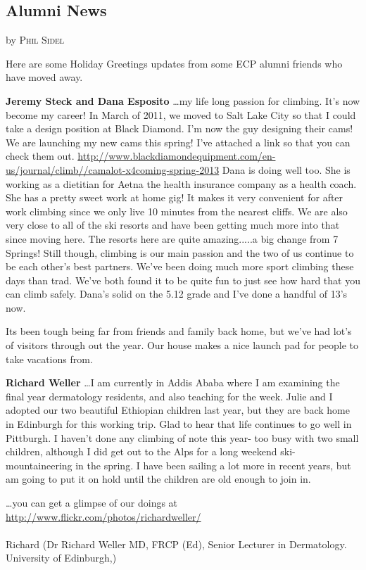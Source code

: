 \documentclass[10pt,a4paper]{article}
\newcommand{\NewsItem}[1]{%
		\usefont{T1}{augie}{m}{n} 	
		\large \bf #1 \vspace{4pt}
		\par \normalsize \normalfont}
\newcommand{\NewsAuthor}[1]{%
			\hfill by \textsc{#1} \vspace{4pt}
			\par \normalfont}
\newcommand\subsect[1]{%
  \subsection*{#1}%
  \addcontentsline{toc}{subsection}{#1}}
\begin{document}
\begin{multicols}{2}
\subsect{Alumni News}

\NewsItem{}
\NewsAuthor{Phil Sidel}
Here are some Holiday Greetings updates from some ECP alumni friends who have moved away.

\vspace{10pt}

\textbf{Jeremy Steck and Dana Esposito}
\dots my life long passion for climbing.   It's now become my career!   In March of 2011, we moved to Salt Lake City so that I could take a design position at Black Diamond.   I'm now the guy designing their cams!   We are launching my new cams this spring!  I've attached a link so that you can check them out.
\url{http://www.blackdiamondequipment.com/en-us/journal/climb//camalot-x4coming-spring-2013}
Dana is doing well too.  She is working as a dietitian for Aetna the health insurance company as a health coach.    She has a pretty sweet work at home gig!   It makes it very convenient for after work climbing since we only live 10 minutes from the nearest cliffs.  We are also very close to all of the ski resorts and have been getting much more into that since moving here.   The resorts here are quite amazing.....a big change from 7 Springs!    Still though, climbing is our main passion and the two of us continue to be each other's best partners.   We've been doing much more sport climbing these days than trad.  We've both found it to be quite fun to just see how hard that you can climb safely.   Dana's solid on the 5.12 grade and I've done a handful of 13's now.    


    Its been tough being far from friends and family back home, but we've had lot's of visitors through out the year. Our house makes a nice launch pad for people to take vacations from.   

\vspace{10pt}

\textbf{Richard Weller}
\dots I  am currently in Addis Ababa where I am examining the final year dermatology residents, and also teaching for the week. Julie and I adopted our two beautiful Ethiopian children last year, but they are back home in Edinburgh for this working trip.
   Glad to hear that life continues to go well in Pittburgh.  I haven't done any climbing  of note this year- too busy with two small children, although I did get out to the Alps for a long weekend ski-mountaineering in the spring.  I have been sailing a lot more in recent years, but am going to put it on hold until the children are old enough to join in.
  
  	\dots you  can get a glimpse of our doings at \url{http://www.flickr.com/photos/richardweller/}
\\
\\
Richard (Dr Richard Weller MD, FRCP (Ed), Senior Lecturer in Dermatology. University of Edinburgh,)


\end{multicols}
\end{document}
